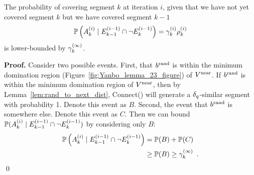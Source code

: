 \begin{lemma}
    The probability of covering segment $k$ at iteration $i$, given that we have not yet covered segment $k$ but we have covered segment $k-1$
    $$\mathbb{P}\left( A_k^{(i)} \mid E_{k-1}^{(i-1)} \cap \neg E_k^{(i-1)} \right) = \gamma_k^{(i)} \rho_k^{(i)}$$
    is lower-bounded by $\gamma_k^{(\infty)}$.
\end{lemma}

\noindent
{\bf Proof.}
Consider two possible events. First, that $b^\textrm{rand}$ is within the minimum domination region (Figure~\ref{fig:Yanbo_lemma_23_figure}) of $V^{\textrm{near}}$. If $b^\textrm{rand}$ is within the minimum domination region of $V^{\textrm{near}}$, then by Lemma~\ref{lem:rand_to_next_dist}, Connect() will generate a $\delta_q$-similar segment with probability 1. Denote this event as $B$. Second, the event that $b^\textrm{rand}$ is somewhere else. Denote this event as $C$. Then we can bound $\mathbb{P}( A_k^{(i)} \mid E_{k-1}^{(i-1)} \cap \neg E_k^{(i-1)})$ by considering only $B$:
\begin{align*}
    \mathbb{P}\left( A_k^{(i)} \mid E_{k-1}^{(i-1)} \cap \neg E_k^{(i-1)} \right) 
        &= \mathbb{P}(B) + \mathbb{P}(C) \\
        &\geq \mathbb{P}(B) \geq \gamma_k^{(\infty)} \enspace .
\end{align*}
\qed

